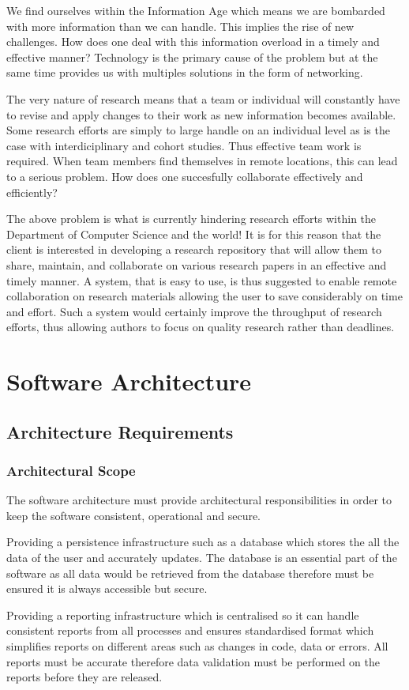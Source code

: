 \documentclass[a4paper,12pt]{article}
\begin{document}
We find ourselves within the Information Age which means we are bombarded with more information than we can handle. This implies the rise of new challenges. How does one deal with this information overload in a timely and effective manner? Technology is the primary cause of the problem but at the same time provides us with multiples solutions in the form of networking. 

The very nature of research means that a team or individual will constantly have to revise and apply changes to their work as new information becomes available. Some research efforts are simply to large handle on an individual level as is the case with interdiciplinary and cohort studies. Thus effective team work is required. When team members find themselves in remote locations, this can lead to a serious problem. How does one succesfully collaborate effectively and efficiently?

The above problem is what is currently hindering research efforts within the Department of Computer Science and the world! It is for this reason that the client is interested in developing a research repository that will allow them to share, maintain, and collaborate on various research papers in an effective and timely manner. A system, that is easy to use, is thus suggested to enable remote collaboration on research materials allowing the user to save considerably on time and effort. Such a system would certainly improve the throughput of research efforts, thus allowing authors to focus on quality research rather than deadlines.  

\newpage
\section{Software Architecture}
\subsection{Architecture Requirements}
\subsubsection{Architectural Scope}
\begin{flushleft}

The software architecture must provide architectural responsibilities in order to keep the software consistent, operational and secure.

Providing a persistence infrastructure such as a database which stores the all the data of the user and accurately updates. 
The database is an essential part of the software as all data would be retrieved from the database therefore must be
ensured it is always accessible but secure.

Providing a reporting infrastructure which is centralised so it can handle consistent reports from all processes and ensures standardised format 
which simplifies reports on different areas such as changes in code, data or errors. All reports must be accurate therefore data validation must be performed on the reports before they are released.
\end{flushleft}
\end{document}
